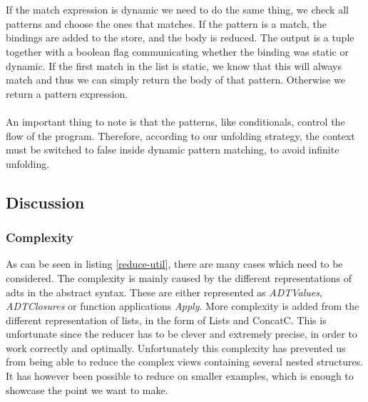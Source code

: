 \\\\
If the match expression is dynamic we need to do the same thing, we check all patterns and choose the ones that matches. If the pattern is a match, the bindings are added to the store, and the body is reduced. The output is a tuple together with a boolean flag communicating whether the binding was static or dynamic. If the first match in the list is static, we know that this will always match and thus we can simply return the body of that pattern. Otherwise we return a pattern expression. 
\\\\
An important thing to note is that the patterns, like conditionals, control the flow of the program. Therefore, according to our unfolding strategy, the context must be switched to false inside dynamic pattern matching, to avoid infinite unfolding.





\subsection{Discussion}
\subsubsection{Complexity} As can be seen in listing \ref{reduce-util}, there are many cases which need to be considered. The complexity is mainly caused by the different representations of \glspl{adt} in the abstract syntax. These are either represented as \textit{ADTValues}, \textit{ADTClosures} or function applications \textit{Apply}. More complexity is added from the different representation of lists, in the form of Lists and ConcatC. This is unfortunate since the reducer has to be clever and extremely precise, in order to work correctly and optimally. Unfortunately this complexity has prevented us from being able to reduce the complex views containing several nested structures. It has however been possible to reduce on smaller examples, which is enough to showcase the point we want to make.

